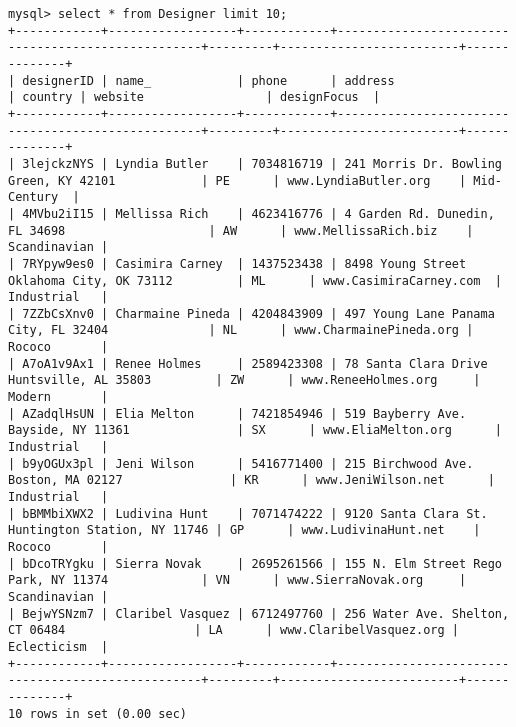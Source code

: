 \documentclass[american,extrafontsizes,12pt,portrait,letterpaper,oneside,onecolumn,article,final]{memoir}
\begin{document}
\begin{verbatim}
mysql> select * from Designer limit 10;
+------------+------------------+------------+---------------------------------------------------+---------+-------------------------+--------------+
| designerID | name_            | phone      | address                                           | country | website                 | designFocus  |
+------------+------------------+------------+---------------------------------------------------+---------+-------------------------+--------------+
| 3lejckzNYS | Lyndia Butler    | 7034816719 | 241 Morris Dr. Bowling Green, KY 42101            | PE      | www.LyndiaButler.org    | Mid-Century  |
| 4MVbu2iI15 | Mellissa Rich    | 4623416776 | 4 Garden Rd. Dunedin, FL 34698                    | AW      | www.MellissaRich.biz    | Scandinavian |
| 7RYpyw9es0 | Casimira Carney  | 1437523438 | 8498 Young Street Oklahoma City, OK 73112         | ML      | www.CasimiraCarney.com  | Industrial   |
| 7ZZbCsXnv0 | Charmaine Pineda | 4204843909 | 497 Young Lane Panama City, FL 32404              | NL      | www.CharmainePineda.org | Rococo       |
| A7oA1v9Ax1 | Renee Holmes     | 2589423308 | 78 Santa Clara Drive Huntsville, AL 35803         | ZW      | www.ReneeHolmes.org     | Modern       |
| AZadqlHsUN | Elia Melton      | 7421854946 | 519 Bayberry Ave. Bayside, NY 11361               | SX      | www.EliaMelton.org      | Industrial   |
| b9yOGUx3pl | Jeni Wilson      | 5416771400 | 215 Birchwood Ave. Boston, MA 02127               | KR      | www.JeniWilson.net      | Industrial   |
| bBMMbiXWX2 | Ludivina Hunt    | 7071474222 | 9120 Santa Clara St. Huntington Station, NY 11746 | GP      | www.LudivinaHunt.net    | Rococo       |
| bDcoTRYgku | Sierra Novak     | 2695261566 | 155 N. Elm Street Rego Park, NY 11374             | VN      | www.SierraNovak.org     | Scandinavian |
| BejwYSNzm7 | Claribel Vasquez | 6712497760 | 256 Water Ave. Shelton, CT 06484                  | LA      | www.ClaribelVasquez.org | Eclecticism  |
+------------+------------------+------------+---------------------------------------------------+---------+-------------------------+--------------+
10 rows in set (0.00 sec)


\end{verbatim}
\end{document}

